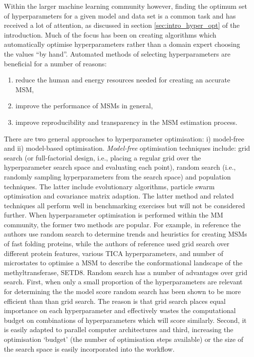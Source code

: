 Within the larger machine learning community however, finding the optimum set of hyperparameters for a given model and data set is a common task and has received a lot of attention, as discussed in section \ref{sec:intro_hyper_opt} of the introduction. Much of the focus has been on creating algorithms which automatically optimise hyperparameters rather than a domain expert choosing the values ``by hand''\cite{feurer2019hyperparameter}.  Automated methods of selecting hyperparameters are beneficial for a number of reasons\cite{feurer2019hyperparameter}:
\begin{enumerate}
    \item reduce the human and energy resources needed for creating an accurate MSM,
    \item improve the performance of MSMs in general,
    \item improve reproducibility and transparency in the MSM estimation process. 
\end{enumerate}
There are two general approaches to hyperparameter optimisation: i) model-free and ii) model-based optimisation\cite{feurer2019hyperparameter}. \emph{Model-free} optimisation techniques include\cite{feurer2019hyperparameter}: grid search (or full-factorial design\cite{c1997montgomery}, i.e., placing a regular grid over the hyperparameter search space and evaluating each point), random search (i.e., randomly sampling hyperparameters from the search space)  and population techniques. The latter include evolutionary algorithms\cite{simon2013evolutionary},  particle swarm optimisation\cite{kennedyParticleSwarmOptimization1995,eberhart1998comparison} and covariance matrix adaption\cite{hansenCMAEvolutionStrategy2016}. The latter method and related techniques all perform well in benchmarking exercises\cite{dufosse2019benchmarking,faury2019benchmarking,bodner2019benchmarking} but will not be considered further. When hyperparameter optimisation is performed within the MM community, the former two methods are popular. For example, in reference \cite{husicOptimizedParameterSelection2016} the authors use random search to determine trends and heuristics for creating MSMs of fast folding proteins, while the authors of reference \cite{chenDynamicConformationalLandscape2019} used grid search over different protein features, various TICA hyperparameters, and number of microstates to optimise a MSM to describe the conformational landscape of the methyltransferase, SETD8. Random search has a number of advantages over grid search. First, when only a small proportion of the hyperparameters are relevant for determining the the model score random search has been shown\cite{bergstrajamesbergstraRandomSearchHyperParameter2012} to be more efficient than  than grid search. The reason is that grid search places equal importance on each hyperparameter and effectively wastes the computational budget on combinations of hyperparameters which will score similarly. Second, it is easily adapted to parallel computer architectures and third, increasing the optimisation `budget' (the number of optimisation steps available) or the size of the search space is easily incorporated into the workflow\cite{feurer2019hyperparameter}.

